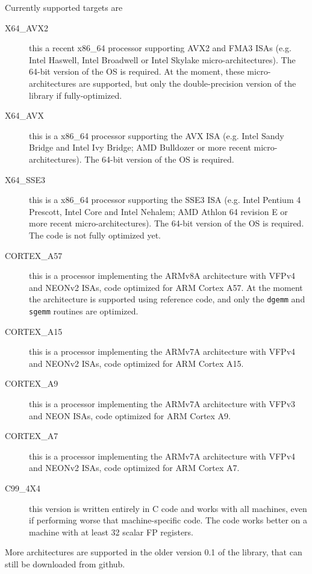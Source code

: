 \documentclass[a4paper]{report}
\begin{document}
Currently supported targets are
\begin{description}

\item[X64\_AVX2] this a recent x86\_64 processor supporting AVX2 and FMA3 ISAs (e.g. Intel Haswell, Intel Broadwell or Intel Skylake micro-architectures). 
The 64-bit version of the OS is required. 
At the moment, these micro-architectures are supported, but only the double-precision version of the library if fully-optimized.

\item[X64\_AVX] this is a x86\_64 processor supporting the AVX ISA (e.g. Intel Sandy Bridge and Intel Ivy Bridge; AMD Bulldozer or more recent micro-architectures). 
The 64-bit version of the OS is required.

\item[X64\_SSE3] this is a x86\_64 processor supporting the SSE3 ISA (e.g. Intel Pentium 4 Prescott, Intel Core and Intel Nehalem; AMD Athlon 64 revision E or more recent micro-architectures). 
The 64-bit version of the OS is required. 
The code is not fully optimized yet.

\item[CORTEX\_A57] this is a processor implementing the ARMv8A architecture with VFPv4 and NEONv2 ISAs, code optimized for ARM Cortex A57.
At the moment the architecture is supported using reference code, and only the {\tt dgemm} and {\tt sgemm} routines are optimized.

\item[CORTEX\_A15] this is a processor implementing the ARMv7A architecture with VFPv4 and NEONv2 ISAs, code optimized for ARM Cortex A15.

\item[CORTEX\_A9] this is a processor implementing the ARMv7A architecture with VFPv3 and NEON ISAs, code optimized for ARM Cortex A9.

\item[CORTEX\_A7] this is a processor implementing the ARMv7A architecture with VFPv4 and NEONv2 ISAs, code optimized for ARM Cortex A7.

\item[C99\_4X4] this version is written entirely in C code and works with all machines, even if performing worse that machine-specific code. 
The code works better on a machine with at least 32 scalar FP registers.

\end{description}
More architectures are supported in the older version 0.1 of the library, that can still be downloaded from github.
\end{document}
